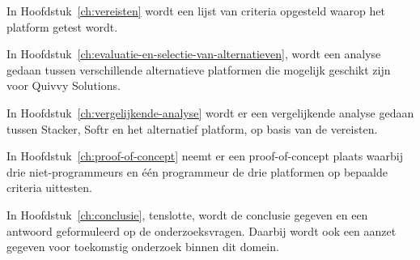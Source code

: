 In Hoofdstuk~\ref{ch:vereisten} wordt een lijst van criteria opgesteld waarop het platform getest wordt.

In Hoofdstuk~\ref{ch:evaluatie-en-selectie-van-alternatieven}, wordt een analyse gedaan tussen verschillende alternatieve platformen die mogelijk geschikt zijn voor Quivvy Solutions.

In Hoofdstuk~\ref{ch:vergelijkende-analyse} wordt er een vergelijkende analyse gedaan tussen Stacker, Softr en het alternatief platform, op basis van de vereisten.

In Hoofdstuk~\ref{ch:proof-of-concept} neemt er een proof-of-concept plaats waarbij drie niet-programmeurs en één programmeur de drie platformen op bepaalde criteria uittesten.

In Hoofdstuk~\ref{ch:conclusie}, tenslotte, wordt de conclusie gegeven en een antwoord geformuleerd op de onderzoeksvragen. Daarbij wordt ook een aanzet gegeven voor toekomstig onderzoek binnen dit domein.